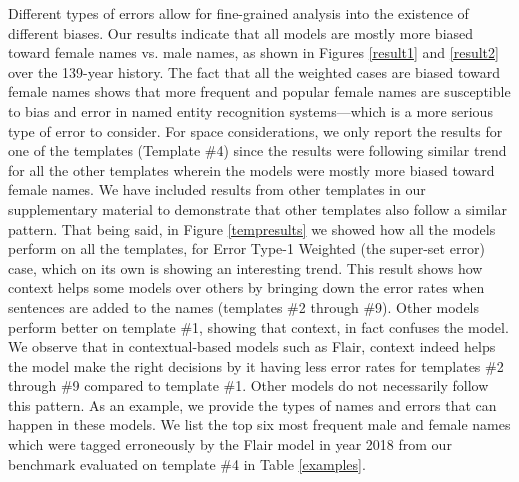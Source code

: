 Different types of errors allow for fine-grained analysis into the existence of different biases. Our results indicate that all models are mostly more biased toward female names vs. male names, as shown in Figures \ref{result1} and \ref{result2} over the 139-year history. The fact that all the weighted cases are biased toward female names shows that more frequent and popular female names are susceptible to bias and error in named entity recognition systems---which is a more serious type of error to consider. For space considerations, we only report the results for one of the templates (Template \#4) since the results were following similar trend for all the other templates wherein the models were mostly more biased toward female names. We have included results from other templates in our supplementary material to demonstrate that other templates also follow a similar pattern. That being said, in Figure \ref{tempresults} we showed how all the models perform on all the templates, for Error Type-1 Weighted (the super-set error) case, which on its own is showing an interesting trend. This result shows how context helps some models over others by bringing down the error rates when sentences are added to the names (templates \#2 through \#9). Other models perform better on template \#1, showing that context, in fact confuses the model. We observe that in contextual-based models such as Flair, context indeed helps the model make the right decisions by it having less error rates for templates \#2 through \#9 compared to template \#1. Other models do not necessarily follow this pattern. 
As an example, we provide the types of names and errors that can happen in these models. We list the top six most frequent male and female names which were tagged erroneously by the Flair model in year 2018 from our benchmark evaluated on template \#4 in Table \ref{examples}.